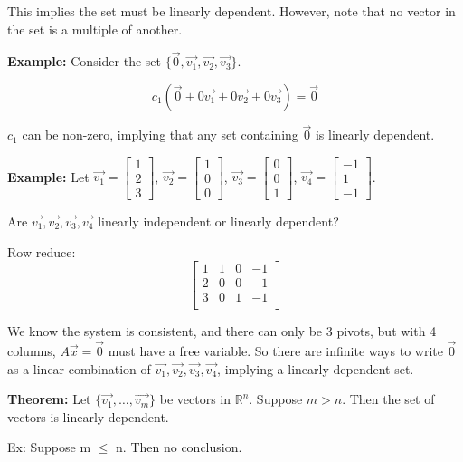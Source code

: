\documentclass{article}
\begin{document}
This implies the set must be linearly dependent. However, note that no vector in the set is a multiple of another.


\textbf{Example:} Consider the set \(\{\vec{0}, \vec{v_1}, \vec{v_2}, \vec{v_3}\}\).

\[c_1(\vec{0}+0\vec{v_1}+0\vec{v_2}+0\vec{v_3}) = \vec{0}\]

\(c_1\) can be non-zero, implying that any set containing \(\vec{0}\) is linearly dependent.


\textbf{Example:} Let \(\vec{v_1} = \begin{bmatrix} 1 \\ 2 \\ 3 \end{bmatrix}\), \(\vec{v_2} = \begin{bmatrix} 1 \\ 0 \\ 0 \end{bmatrix}\), \(\vec{v_3} = \begin{bmatrix} 0 \\ 0 \\ 1 \end{bmatrix}\), \(\vec{v_4} = \begin{bmatrix} -1 \\ 1 \\ -1 \end{bmatrix}\).

Are \(\vec{v_1}, \vec{v_2}, \vec{v_3}, \vec{v_4}\) linearly independent or linearly dependent?

Row reduce:
\[
\begin{bmatrix}
    1 & 1 & 0 & -1 \\
    2 & 0 & 0 & -1 \\
    3 & 0 & 1 & -1 \\
\end{bmatrix}
\]

We know the system is consistent, and there can only be 3 pivots, but with 4 columns, \(A\vec{x}=\vec{0}\) must have a free variable. So there are infinite ways to write \(\vec{0}\) as a linear combination of \(\vec{v_1}, \vec{v_2}, \vec{v_3}, \vec{v_4}\), implying a linearly dependent set.

\textbf{Theorem:} Let \(\{\vec{v_1}, \ldots, \vec{v_m}\}\) be vectors in \(\mathbb{R}^n\). Suppose \(m > n\). Then the set of vectors is linearly dependent.


Ex: Suppose m $\leq$ n. Then no conclusion.
\end{document}

